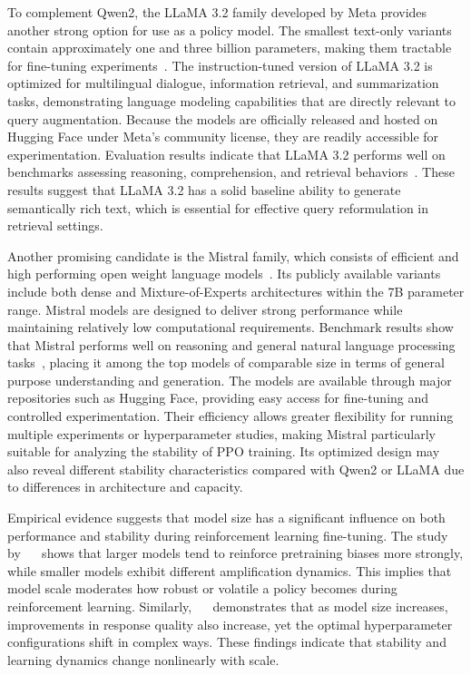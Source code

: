 To complement Qwen2, the LLaMA 3.2 family developed by Meta provides another strong option for use as a policy model. The smallest text-only variants contain approximately one and three billion parameters, making them tractable for fine-tuning experiments~\cite{Llama3_2_3B}. The instruction-tuned version of LLaMA 3.2 is optimized for multilingual dialogue, information retrieval, and summarization tasks, demonstrating language modeling capabilities that are directly relevant to query augmentation. Because the models are officially released and hosted on Hugging Face under Meta’s community license, they are readily accessible for experimentation. Evaluation results indicate that LLaMA 3.2 performs well on benchmarks assessing reasoning, comprehension, and retrieval behaviors~\cite{MetaLlama32Blog}. These results suggest that LLaMA 3.2 has a solid baseline ability to generate semantically rich text, which is essential for effective query reformulation in retrieval settings.

Another promising candidate is the Mistral family, which consists of efficient and high performing open weight language models~\cite{jiang2023mistral7b}. Its publicly available variants include both dense and Mixture-of-Experts architectures within the 7B parameter range. Mistral models are designed to deliver strong performance while maintaining relatively low computational requirements. Benchmark results show that Mistral performs well on reasoning and general natural language processing tasks~\cite{jiang2023mistral7b}, placing it among the top models of comparable size in terms of general purpose understanding and generation. The models are available through major repositories such as Hugging Face, providing easy access for fine-tuning and controlled experimentation. Their efficiency allows greater flexibility for running multiple experiments or hyperparameter studies, making Mistral particularly suitable for analyzing the stability of PPO training. Its optimized design may also reveal different stability characteristics compared with Qwen2 or LLaMA due to differences in architecture and capacity.

Empirical evidence suggests that model size has a significant influence on both performance and stability during reinforcement learning fine-tuning. The study by ~\citeauthor{zhao2025echo}~\cite{zhao2025echo} shows that larger models tend to reinforce pretraining biases more strongly, while smaller models exhibit different amplification dynamics. This implies that model scale moderates how robust or volatile a policy becomes during reinforcement learning. Similarly, ~\citeauthor{huang2024n+}~\cite{huang2024n+} demonstrates that as model size increases, improvements in response quality also increase, yet the optimal hyperparameter configurations shift in complex ways. These findings indicate that stability and learning dynamics change nonlinearly with scale.

